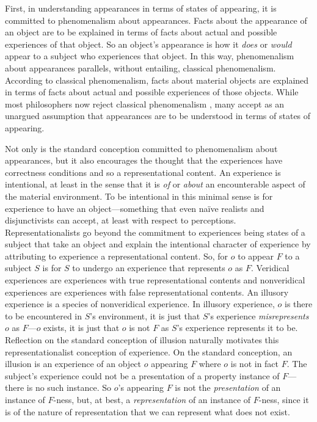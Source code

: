 \documentclass[12pt]{article}
\begin{document}
First, in understanding appearances in terms of states of appearing, it is committed to phenomenalism about appearances. Facts about the appearance of an object are to be explained in terms of facts about actual and possible experiences of that object. So an object's appearance is how it \emph{does} or \emph{would} appear to a subject who experiences that object. In this way, phenomenalism about appearances parallels, without entailing, classical phenomenalism. According to classical phenomenalism, facts about material objects are explained in terms of facts about actual and possible experiences of those objects. While most philosophers now reject classical phenomenalism \citep[though see][]{Foster:00ny}, many accept as an unargued assumption that appearances are to be understood in terms of states of appearing. 

Not only is the standard conception committed to phenomenalism about appearances, but it also encourages the thought that the experiences have correctness conditions and so a representational content. An experience is intentional, at least in the sense that it is \emph{of} or \emph{about} an encounterable aspect of the material environment. To be intentional in this minimal sense is for experience to have an object---something that even naïve realists and disjunctivists can accept, at least with respect to perceptions. Representationalists go beyond the commitment to experiences being states of a subject that take an object and explain the intentional character of experience by attributing to experience a representational content. So, for \( o \) to appear \( F \) to a subject \( S \) is for \( S \) to undergo an experience that represents \( o \) as \( F \). Veridical experiences are experiences with true representational contents and nonveridical experiences are experiences with false representational contents. An illusory experience is a species of nonveridical experience. In illusory experience, \( o \) is there to be encountered in \( S \)'s environment, it is just that \( S \)'s experience \emph{misrepresents} \( o \) as \( F \)---\( o \) exists, it is just that \( o \) is not \( F \) as \( S \)'s experience represents it to be. Reflection on the standard conception of illusion naturally motivates this representationalist conception of experience. On the standard conception, an illusion is an experience of an object \( o \) appearing \( F \) where \( o \) is not in fact \( F \). The subject's experience could not be a presentation of a property instance of \( F \)---there is no such instance. So \( o \)'s appearing \( F \) is not the \emph{presentation} of an instance of \( F \)-ness, but, at best, a \emph{representation} of an instance of \( F \)-ness, since it is of the nature of representation that we can represent what does not exist.
\end{document}
